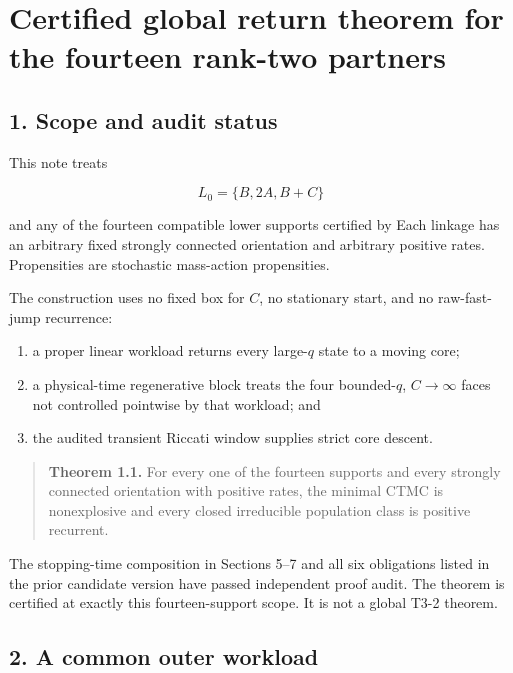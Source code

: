 \section{Certified global return theorem for the fourteen rank-two
partners}

\subsection{1. Scope and audit status}

This note treats

\[
 L_0=\{B,2A,B+C\}                                      \tag{1.1}
\]

and any of the fourteen compatible lower supports certified by
\texttt{} Each linkage has an arbitrary fixed
strongly connected orientation and arbitrary positive rates.
Propensities are stochastic mass-action propensities.

The construction uses no fixed box for \(C\), no stationary start, and
no raw-fast-jump recurrence:

\begin{enumerate}
\def\labelenumi{\arabic{enumi}.}
\tightlist
\item
  a proper linear workload returns every large-\(q\) state to a moving
  core;
\item
  a physical-time regenerative block treats the four bounded-\(q\),
  \(C\to\infty\) faces not controlled pointwise by that workload; and
\item
  the audited transient Riccati window supplies strict core descent.
\end{enumerate}

\begin{quote}
\textbf{Theorem 1.1.} For every one of the fourteen supports and every
strongly connected orientation with positive rates, the minimal CTMC is
nonexplosive and every closed irreducible population class is positive
recurrent.
\end{quote}

The stopping-time composition in Sections 5--7 and all six obligations
listed in the prior candidate version have passed independent proof
audit. The theorem is certified at exactly this fourteen-support scope.
It is not a global T3-2 theorem.

\subsection{2. A common outer workload}

